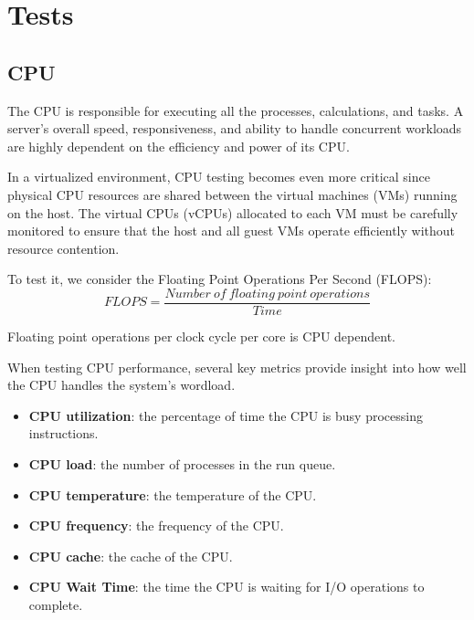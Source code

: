 \section{Tests}

\subsection{CPU}

The CPU is responsible for executing all the
processes, calculations, and tasks. A server’s
overall speed, responsiveness, and ability to
handle concurrent workloads are highly
dependent on the efficiency and power of its
CPU.

In a virtualized environment, CPU testing becomes even more critical since
physical CPU resources are shared between the virtual machines (VMs)
running on the host. The virtual CPUs (vCPUs) allocated to each VM must be
carefully monitored to ensure that the host and all guest VMs operate
efficiently without resource contention.

To test it, we consider the Floating Point Operations Per Second (FLOPS):
$$
FLOPS = \frac{Number\ of\ floating\ point\ operations}{Time}
$$

Floating point operations per clock cycle per core is CPU dependent. 

When testing CPU performance, several key metrics provide insight into how well the CPU handles the system's wordload. 

\begin{itemize}
    \item \textbf{CPU utilization}: the percentage of time the CPU is busy processing instructions.
    \item \textbf{CPU load}: the number of processes in the run queue.
    \item \textbf{CPU temperature}: the temperature of the CPU.
    \item \textbf{CPU frequency}: the frequency of the CPU.
    \item \textbf{CPU cache}: the cache of the CPU.
    \item \textbf{CPU Wait Time}: the time the CPU is waiting for I/O operations to complete.
\end{itemize}

